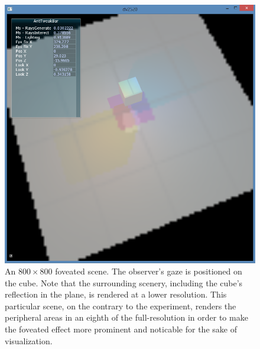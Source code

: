 \begin{figure}[p]
  \centering
  \includegraphics[width=1.0\linewidth]{img/fov_rt_et.png}
  \caption{An $800\times 800$ foveated scene. The observer's gaze is positioned on the cube. Note that the surrounding scenery, including the cube's reflection in the plane, is rendered at a lower resolution. This particular scene, on the contrary to the experiment, renders the peripheral areas in an eighth of the full-resolution in order to make the foveated effect more prominent and noticable for the sake of visualization.}
  \label{fig:fov}
\end{figure}

